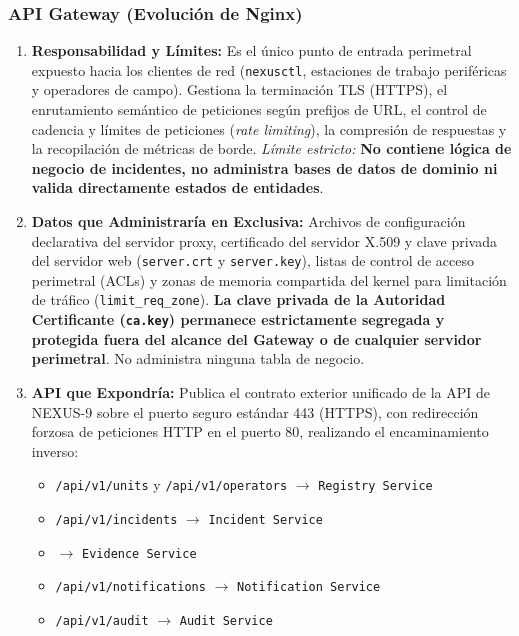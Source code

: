 \documentclass[10pt,a4paper]{article}
\begin{document}
\subsubsection{API Gateway (Evolución de Nginx)}

\begin{enumerate}[leftmargin=*]
    \item \textbf{Responsabilidad y Límites:} Es el único punto de entrada perimetral expuesto hacia los clientes de red (\texttt{nexusctl}, estaciones de trabajo periféricas y operadores de campo). Gestiona la terminación TLS (HTTPS), el enrutamiento semántico de peticiones según prefijos de URL, el control de cadencia y límites de peticiones (\textit{rate limiting}), la compresión de respuestas y la recopilación de métricas de borde. \textit{Límite estricto:} \textbf{No contiene lógica de negocio de incidentes, no administra bases de datos de dominio ni valida directamente estados de entidades}.
    \item \textbf{Datos que Administraría en Exclusiva:} Archivos de configuración declarativa del servidor proxy, certificado del servidor X.509 y clave privada del servidor web (\texttt{server.crt} y \texttt{server.key}), listas de control de acceso perimetral (ACLs) y zonas de memoria compartida del kernel para limitación de tráfico (\texttt{limit\_req\_zone}). \textbf{La clave privada de la Autoridad Certificante (\texttt{ca.key}) permanece estrictamente segregada y protegida fuera del alcance del Gateway o de cualquier servidor perimetral}. No administra ninguna tabla de negocio.
    \item \textbf{API que Expondría:} Publica el contrato exterior unificado de la API de NEXUS-9 sobre el puerto seguro estándar 443 (HTTPS), con redirección forzosa de peticiones HTTP en el puerto 80, realizando el encaminamiento inverso:
    \begin{itemize}[leftmargin=*]
        \item \texttt{/api/v1/units} y \texttt{/api/v1/operators} $\longrightarrow$ \texttt{Registry Service}
        \item \texttt{/api/v1/incidents} $\longrightarrow$ \texttt{Incident Service}
        \item {} $\longrightarrow$ \texttt{Evidence Service}
        \item \texttt{/api/v1/notifications} $\longrightarrow$ \texttt{Notification Service}
        \item \texttt{/api/v1/audit} $\longrightarrow$ \texttt{Audit Service}

\end{itemize}
\end{enumerate}
\end{document}

